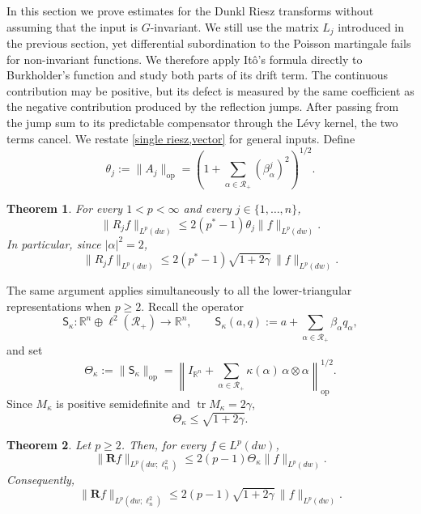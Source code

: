 \documentclass[11pt]{amsart}
\newtheorem{theorem}{Theorem}[section]
\theoremstyle{definition}
\theoremstyle{remark}
\numberwithin{equation}{section}
\newcommand{\R}{\mathbb{R}}
\newcommand{\RR}{\mathcal{R}}
\begin{document}
In this section we prove estimates for the Dunkl Riesz transforms without
assuming that the input is $G$-invariant. We still use the matrix
$L_j$ introduced in the previous section, yet differential
subordination to the Poisson martingale fails for non-invariant functions. We therefore apply It\^o's formula
directly to Burkholder's function and study both parts of its
drift term. The continuous contribution may be positive, but its defect is measured
by the same coefficient as the negative contribution produced by the
reflection jumps. After passing from the jump sum to its predictable
compensator through the L\'evy kernel, the two terms
cancel. We restate \cref{single riesz,vector} for general inputs. Define
\begin{equation}
\theta_j
:=\|A_j\|_{\mathrm{op}}
=\left(1+\sum_{\alpha\in\RR_+}(\beta_\alpha^j)^2\right)^{1/2}.
\end{equation}

\begin{theorem}
\label{Riesz}
For every $1<p<\infty$ and every $j\in\{1,\ldots,n\}$,
\[
\|R_jf\|_{L^p(dw)}
\leq2(p^*-1)\theta_j\|f\|_{L^p(dw)}.
\]
In particular, since $|\alpha|^2=2$,
\[
\|R_jf\|_{L^p(dw)}
\leq2(p^*-1)\sqrt{1+2\gamma}\,\|f\|_{L^p(dw)}.
\]
\end{theorem}

The same argument applies simultaneously to all the lower-triangular
representations when $p\geq2$. Recall the operator
\[
\mathsf S_\kappa:
\R^n\oplus\ell^2(\RR_+)\longrightarrow\R^n,
\qquad
\mathsf S_\kappa(a,q):=a+\sum_{\alpha\in\RR_+}\beta_\alpha q_\alpha,
\]
and set
\[
\Theta_\kappa:=\|\mathsf S_\kappa\|_{\mathrm{op}}
=\left\|I_{\R^n}
+\sum_{\alpha\in\RR_+}\kappa(\alpha)\,\alpha\otimes\alpha
\right\|_{\mathrm{op}}^{1/2}.
\]
Since $M_\kappa$ is positive semidefinite and $\operatorname{tr}M_\kappa=2\gamma$,
\[
\Theta_\kappa\leq\sqrt{1+2\gamma}.
\]

\begin{theorem}
\label{thm:Riesz-vector-noninvariant}
Let $p\geq2$. Then, for every $f\in L^p(dw)$,
\[
\|\mathbf Rf\|_{L^p(dw;\ell_n^2)}
\leq2(p-1)\Theta_\kappa\|f\|_{L^p(dw)}.
\]
Consequently,
\[
\|\mathbf Rf\|_{L^p(dw;\ell_n^2)}
\leq2(p-1)\sqrt{1+2\gamma}\,\|f\|_{L^p(dw)}.
\]
\end{theorem}
\end{document}
